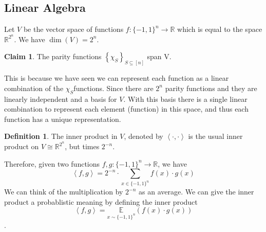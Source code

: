 \documentclass[a4paper,titlepage,twocolumn]{book}
\theoremstyle{definition}
\newtheorem{claim}{Claim}[section]
\newtheorem{definition}{Definition}[section]
\newcommand{\chis}{\ensuremath{\chi_S}}
\newcommand{\func}[3]{\ensuremath{#1:#2\rightarrow #3}}
\newcommand{\MO}[1][]{\ensuremath{\{-1,1\}^{#1}}}
\newcommand{\sqbkt}[1][n]{\ensuremath{\left[#1\right]}}
\newcommand{\innerprod}[2]{\ensuremath{\left<#1,#2\right>}}
\newcommand{\Reals}{\ensuremath{\mathbb{R}}}
\newcommand{\Expectation}[2]{\ensuremath{\underset{#1}{\mathbb{E}}\left(#2\right)}}
\begin{document}
\subsection{Linear Algebra}
	Let $V$ be the vector space of functions \func{f}{\MO[n]}{\Reals} which is equal to the space $\Reals^{2^n}$. We have $\dim\left(V\right) = 2^n$.
	
	\begin{claim}
		The parity functions $\left\{\chis\right\}_{S\subseteq \sqbkt}$ span V.
	\end{claim}
	This is because we have seen we can represent each function as a linear combination of the \chis functions.
	Since there are $2^n$ parity functions and they are linearly independent and a basis for $V$. With this basis there is a single linear combination to represent each element (function) in this space, and thus each function has a unique representation.
	\begin{definition}
		The inner product in $V$, denoted by $\left<\cdot,\cdot\right>$ is the usual inner product on $V \cong \Reals^{2^n}$, but times $2^{-n}$.
	\end{definition}
	Therefore, given two functions \func{f,g}{\MO[n]}{\Reals}, we have 
	\[
	\innerprod{f}{g} = 2^{-n} \cdot \sum_{x\in \MO[n]}f\left(x\right)\cdot g\left(x\right)
	\]
	We can think of the multiplication by $2^{-n}$ as an average.
	We can give the inner product a probablistic meaning by defining the inner product \[\innerprod{f}{g} = \Expectation{x \sim \MO[n]}{f\left(x\right)\cdot g\left(x\right)}\].
\end{document}
